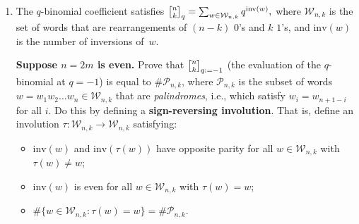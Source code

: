 \documentclass[11pt]{article}
\begin{document}
\begin{enumerate}
\renewcommand{\binom}{\genfrac{(}{)}{0pt}{}}
\DeclareRobustCommand{\qbinom}{\genfrac{\lbrack}{\rbrack}{0pt}{}}

\item The $q$-binomial coefficient satisfies $\qbinom{n}{k}_q = \sum_{w \in \mathcal{W}_{n,k}} q^{\mathrm{inv}(w)},$ where $\mathcal{W}_{n,k}$ is the set of words that are rearrangements of $(n-k)$ $0$'s and $k$ $1$'s, and $\mathrm{inv}(w)$ is the number of inversions of~$w$.

{\bf Suppose $n=2m$ is even.} Prove that $\qbinom{n}{k}_{q := -1}$ (the evaluation of the $q$-binomial at $q=-1$) is equal to $\#\mathcal{P}_{n,k}$, where $\mathcal{P}_{n,k}$ is the subset of words $w=w_1w_2\ldots w_{n} \in \mathcal{W}_{n,k}$ that are \emph{palindromes}, i.e., which satisfy $w_i = w_{n+1-i}$ for all $i$. Do this by defining a {\bf sign-reversing involution}. That is, define an involution $\tau\colon \mathcal{W}_{n,k}\to \mathcal{W}_{n,k}$ satisfying:
\begin{itemize}
\item $\mathrm{inv}(w)$ and $\mathrm{inv}(\tau(w))$ have opposite parity for all $w\in \mathcal{W}_{n,k}$ with $\tau(w)\neq w$;
\item $\mathrm{inv}(w)$ is even for all $w\in \mathcal{W}_{n,k}$ with $\tau(w)=w$;
\item $\#\{w\in \mathcal{W}_{n,k}\colon \tau(w)=w\} = \#\mathcal{P}_{n,k}$.
\end{itemize}

\end{enumerate}
\end{document}
